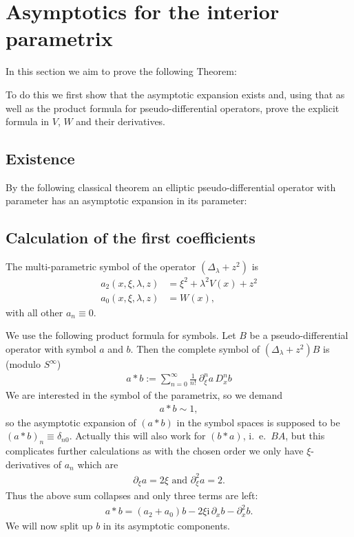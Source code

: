 \section{Asymptotics for the interior parametrix}
In this section we aim to prove the following Theorem:

To do this we first show that the asymptotic expansion exists and, using that as
well as the product formula for pseudo-differential operators, prove the
explicit formula in $V$, $W$ and their derivatives.
\subsection{Existence}
By the following classical theorem an elliptic pseudo-differential operator with
parameter has an asymptotic expansion in its parameter:

\begin{Proof}
\end{Proof}

\subsection{Calculation of the first coefficients}
The multi-parametric symbol of the operator $(\Delta_\lambda + z^2)$ is
\begin{align}
    a_2(x,\xi,\lambda,z) &= \xi^2 + \lambda^2 V(x) + z^2 \\
    a_0(x,\xi,\lambda,z) &= W(x),
    \label{eqn:symbol}
\end{align}
with all other $a_n \equiv 0$.

We use the following product formula for symbols. Let $B$ be a
pseudo-differential operator with symbol $a$ and $b$. Then the complete symbol
of $(\Delta_\lambda + z^2)B$ is (modulo $S^\infty$)
\begin{align}
  a * b := \sum_{n=0}^{\infty} \frac{1}{n!}\ \partial_\xi^n a\,D_x^n b
  \label{eqn:product-formula}
\end{align}
We are interested in the symbol of the parametrix, so we demand
\begin{align*}
  a * b \sim 1,
\end{align*}
so the asymptotic expansion of $(a*b)$ in the symbol spaces is supposed to be
$(a * b)_n \equiv \delta_{n0}$. Actually this will also work for $(b * a)$,
i.~e.\ $BA$, but this complicates further calculations as with the chosen order
we only have $\xi$-derivatives of $a_n$ which are
\begin{align}
  \partial_{\xi} a = 2\xi \text{ and } \partial_{\xi}^2 a = 2.
\end{align}
Thus the above sum collapses and only three terms are left:
\begin{align}
  a * b = (a_2 + a_0)b - 2\xi\mathrm i\,\partial_x b - \partial_x^2 b.
\end{align}
We will now split up $b$ in its asymptotic components.

